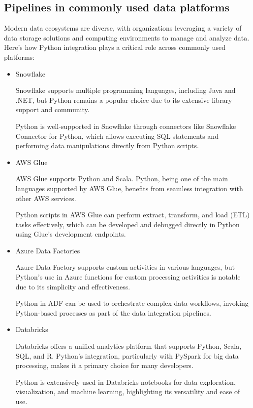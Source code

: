 \subsection{Pipelines in commonly used data platforms}

Modern data ecosystems are diverse, with organizations leveraging a variety of data storage solutions and computing environments to manage and analyze data. Here’s how Python integration plays a critical role across commonly used platforms:

\begin{itemize}

\item  Snowflake

Snowflake\cite{snowflake} supports multiple programming languages, including Java and .NET, but Python remains a popular choice due to its extensive library support and community.

Python is well-supported in Snowflake through connectors like Snowflake Connector for Python, which allows executing SQL statements and performing data manipulations directly from Python scripts.

\item AWS Glue

AWS Glue\cite{aws_glue} supports Python and Scala. Python, being one of the main languages supported by AWS Glue, benefits from seamless integration with other AWS services.

Python scripts in AWS Glue can perform extract, transform, and load (ETL) tasks effectively, which can be developed and debugged directly in Python using Glue’s development endpoints.

\item Azure Data Factories

Azure Data Factory\cite{azure_data_factory} supports custom activities in various languages, but Python’s use in Azure functions for custom processing activities is notable due to its simplicity and effectiveness.

Python in ADF can be used to orchestrate complex data workflows, invoking Python-based processes as part of the data integration pipelines.

\item Databricks

Databricks\cite{databricks} offers a unified analytics platform that supports Python, Scala, SQL, and R. Python’s integration, particularly with PySpark for big data processing, makes it a primary choice for many developers.

Python is extensively used in Databricks notebooks for data exploration, visualization, and machine learning, highlighting its versatility and ease of use.

\end{itemize}

